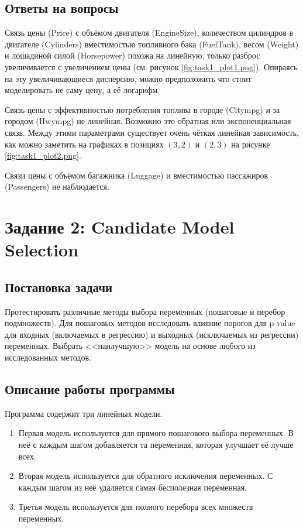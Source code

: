 \documentclass[12pt,a4paper]{article}
\begin{document}
  \subsection{Ответы на вопросы}
  Связь цены (Price) с объёмом двигателя (EngineSize), количеством цилиндров в двигателе (Cylinders)
  вместимостью топливного бака (FuelTank), весом (Weight) и лошадиной силой (Horsepower)
  похожа на линейную, только разброс увеличивается с увеличением цены (см. рисунок \ref{fig:task1_plot1.png}).
  Опираясь на эту увеличивающиеся дисперсию, можно предположить что стоит моделировать не саму цену, а её логарифм.

  Связь цены с эффективностью потребления топлива в городе (Citympg) и за городом (Hwympg) не линейная.
  Возможно это обратная или экспоненциальная связь.
  Между этими параметрами существует очень чёткая линейная зависимость,
  как можно заметить на графиках в позициях $(3, 2)$ и $(2, 3)$ на рисунке \ref{fig:task1_plot2.png}.

  Связи цены с объёмом багажника (Luggage) и вместимостью пассажиров (Passengers)
  не наблюдается.

  \newpage
  \section{Задание 2: Candidate Model Selection}
  \subsection{Постановка задачи}
  Протестировать различные методы выбора переменных (пошаговые и перебор подмножеств).
  Для пошаговых методов исследовать влияние порогов для p-value для входных (включаемых в регрессию)
  и выходных (исключаемых из регрессии) переменных.
  Выбрать <<наилучшую>> модель на основе любого из исследованных методов.

  \subsection{Описание работы программы}
  Программа содержит три линейных модели.
  \begin{enumerate}
    \item Первая модель используется для прямого пошагового выбора переменных.
      В неё с каждым шагом добавляется та переменная, которая улучшает её лучше всех.
    \item Вторая модель используется для обратного исключения переменных.
      С каждым шагом из неё удаляется самая бесполезная переменная.
    \item Третья модель используется для полного перебора всех множеств переменных.
  \end{enumerate}
\end{document}
